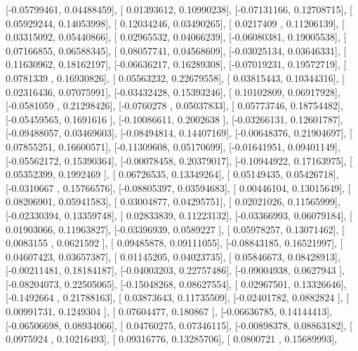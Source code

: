 \documentclass{article}
\begin{document}
       [-0.05799461,  0.04488459],
       [ 0.01393612,  0.10990238],
       [-0.07131166,  0.12708715],
       [ 0.05929244,  0.14053998],
       [ 0.12034246,  0.03490265],
       [ 0.0217409 ,  0.11206139],
       [ 0.03315092,  0.05440866],
       [ 0.02965532,  0.04066239],
       [-0.06080381,  0.19005538],
       [ 0.07166855,  0.06588345],
       [ 0.08057741,  0.04568609],
       [-0.03025134,  0.03646331],
       [ 0.11630962,  0.18162197],
       [-0.06636217,  0.16289308],
       [-0.07019231,  0.19572719],
       [ 0.0781339 ,  0.16930826],
       [ 0.05563232,  0.22679558],
       [ 0.03815443,  0.10344316],
       [ 0.02316436,  0.07075991],
       [-0.03432428,  0.15393246],
       [ 0.10102809,  0.06917928],
       [-0.0581059 ,  0.21298426],
       [-0.0760278 ,  0.05037833],
       [ 0.05773746,  0.18754482],
       [-0.05459565,  0.1691616 ],
       [-0.10086611,  0.2002638 ],
       [-0.03266131,  0.12601787],
       [-0.09488057,  0.03469603],
       [-0.08494814,  0.14407169],
       [-0.00648376,  0.21904697],
       [ 0.07855251,  0.16600571],
       [-0.11309608,  0.05170699],
       [-0.01641951,  0.09401149],
       [-0.05562172,  0.15390364],
       [-0.00078458,  0.20379017],
       [-0.10944922,  0.17163975],
       [ 0.05352399,  0.1992469 ],
       [ 0.06726535,  0.13349264],
       [ 0.05149435,  0.05426718],
       [-0.0310667 ,  0.15766576],
       [-0.08805397,  0.03594683],
       [ 0.00446104,  0.13015649],
       [ 0.08206901,  0.05941583],
       [ 0.03004877,  0.04295751],
       [ 0.02021026,  0.11565999],
       [-0.02330394,  0.13359748],
       [ 0.02833839,  0.11223132],
       [-0.03366993,  0.06079184],
       [ 0.01903066,  0.11963827],
       [-0.03396939,  0.0589227 ],
       [ 0.05978257,  0.13071462],
       [ 0.0083155 ,  0.0621592 ],
       [ 0.09485878,  0.09111055],
       [-0.08843185,  0.16521997],
       [ 0.04607423,  0.03657387],
       [ 0.01145205,  0.04023735],
       [ 0.05846673,  0.08428913],
       [-0.00211481,  0.18184187],
       [-0.04003203,  0.22757486],
       [-0.09004938,  0.0627943 ],
       [-0.08204073,  0.22505065],
       [-0.15048268,  0.08627554],
       [ 0.02967501,  0.13326646],
       [-0.1492664 ,  0.21788163],
       [ 0.03873643,  0.11735509],
       [-0.02401782,  0.0882824 ],
       [ 0.00991731,  0.1249304 ],
       [ 0.07604477,  0.180867  ],
       [-0.06636785,  0.14144413],
       [-0.06506698,  0.08934066],
       [ 0.04760275,  0.07346115],
       [-0.00898378,  0.08863182],
       [ 0.0975924 ,  0.10216493],
       [ 0.09316776,  0.13285706],
       [ 0.0800721 ,  0.15689993],
\end{document}
